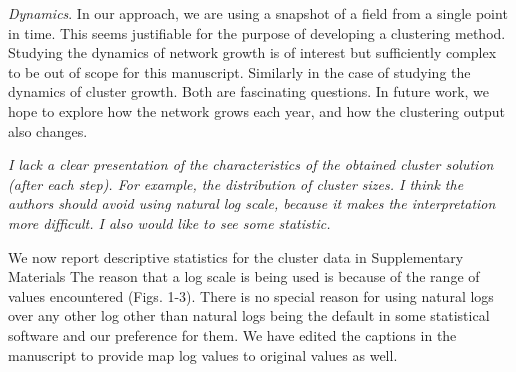 \documentclass[11pt, oneside]{article}   	%
\begin{document}
\emph{Dynamics}. In our approach, we are using a snapshot of a field from a single point in time. This seems justifiable for the purpose of developing a clustering method. Studying the dynamics of network growth is of interest but sufficiently complex to be out of scope for this manuscript. Similarly in the case of studying the dynamics of cluster growth. Both are fascinating questions.  In future work,
we hope to explore how the network grows each year,  and how the clustering output also changes. 
 
\emph{I lack a clear presentation of the characteristics of the obtained cluster solution (after each step). For example, the distribution of cluster sizes. I think the authors should avoid using natural log scale, because it makes the interpretation more difficult. I also would like to see some statistic.}

We now report descriptive statistics for the cluster data in Supplementary Materials The reason that a log scale is being used is because of the range of values encountered (Figs. 1-3). There is no special reason for using natural logs over any other log other than natural logs being the default in some statistical software and our preference for them. We have edited the captions in the manuscript to provide map log values to original values as well. 

\vspace{4 mm}



\end{document}
